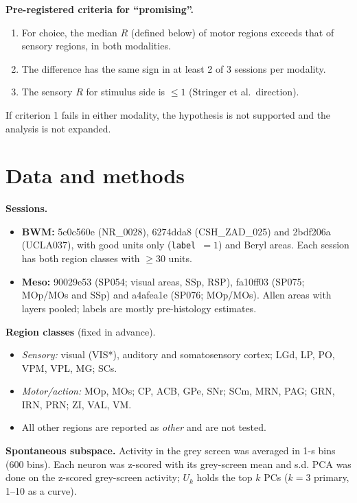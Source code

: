 \documentclass[10pt]{article}
\begin{document}
\textbf{Pre-registered criteria for ``promising''.}
\begin{enumerate}
  \item For choice, the median $R$ (defined below) of motor regions exceeds that of sensory regions, in both modalities.
  \item The difference has the same sign in at least 2 of 3 sessions per modality.
  \item The sensory $R$ for stimulus side is $\le 1$ (Stringer et al.\ direction).
\end{enumerate}
If criterion 1 fails in either modality, the hypothesis is not supported and the analysis is not expanded.

\section{Data and methods}

\textbf{Sessions.}
\begin{itemize}
  \item \textbf{BWM:} 5c0c560e (NR\_0028), 6274dda8 (CSH\_ZAD\_025) and 2bdf206a (UCLA037), with good units only (\texttt{label}~$=1$) and Beryl areas. Each session has both region classes with $\ge30$ units.
  \item \textbf{Meso:} 90029e53 (SP054; visual areas, SSp, RSP), fa10ff03 (SP075; MOp/MOs and SSp) and a4afea1e (SP076; MOp/MOs). Allen areas with layers pooled; labels are mostly pre-histology estimates.
\end{itemize}

\textbf{Region classes} (fixed in advance).
\begin{itemize}
  \item \emph{Sensory:} visual (VIS*), auditory and somatosensory cortex; LGd, LP, PO, VPM, VPL, MG; SCs.
  \item \emph{Motor/action:} MOp, MOs; CP, ACB, GPe, SNr; SCm, MRN, PAG; GRN, IRN, PRN; ZI, VAL, VM.
  \item All other regions are reported as \emph{other} and are not tested.
\end{itemize}

\textbf{Spontaneous subspace.} Activity in the grey screen was averaged in 1-s bins (600 bins). Each neuron was z-scored with its grey-screen mean and s.d. PCA was done on the z-scored grey-screen activity; $U_k$ holds the top $k$ PCs ($k=3$ primary, 1--10 as a curve).
\end{document}
